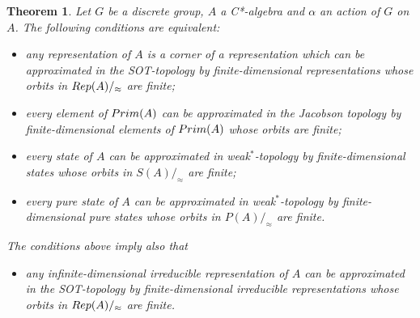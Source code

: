 \documentclass[11 pt, leqno, hidelinks]{amsart}%
\newtheorem{theorem}{Theorem}[section]
\theoremstyle{plain}
\numberwithin{equation}{section}
\newcommand{\Rep}{\textup{Rep}}
\newcommand{\Prim}{\textup{Prim}}
\begin{document}
\begin{theorem}\label{thm:justact}
	Let $G$ be a discrete  group, $A$ a C*-algebra and $\alpha$ an action of $G$ on $A$. The following conditions are equivalent:
	\begin{itemize}	
		\item[(i)] any representation of $A$ is a corner  of a representation which can be approximated in the SOT-topology by finite-dimensional representations whose orbits in $\Rep(A)/_\approx$ are finite; 	
		\item[(ii)]every element of $\Prim(A)$ can be approximated in the Jacobson topology by finite-dimensional elements of $\Prim(A)$ whose orbits are finite;
		\item[(iii)]  every state of $A$ can be approximated in weak$^*$-topology by finite-dimensional  states whose orbits in $S(A)/_\approx$ are finite;
		\item[(iv)] every pure state of $A$ can be approximated in weak$^*$-topology by finite-dimensional  pure states whose orbits in $P(A)/_\approx$ are finite.
\end{itemize}

\noindent The conditions above imply also that
\begin{itemize}

		\item[(v)] any infinite-dimensional irreducible representation of $A$ can be approximated in the SOT-topology by finite-dimensional irreducible  representations whose orbits in $\Rep(A)/_\approx$ are finite.
		
	\end{itemize}
	
\end{theorem}
\end{document}

